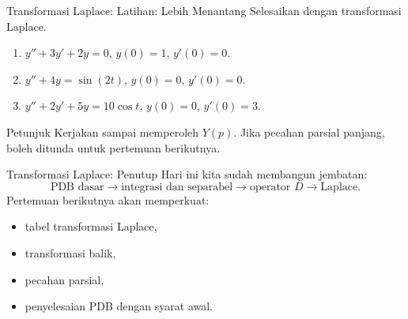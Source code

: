 \documentclass[aspectratio=169,11pt]{beamer}
\begin{document}
\begin{frame}{Transformasi Laplace: Latihan: Lebih Menantang}
Selesaikan dengan transformasi Laplace.
\begin{enumerate}
  \item $y''+3y'+2y=0$, $y(0)=1$, $y'(0)=0$.
  \item $y''+4y=\sin(2t)$, $y(0)=0$, $y'(0)=0$.
  \item $y''+2y'+5y=10\cos t$, $y(0)=0$, $y'(0)=3$.
\end{enumerate}
\begin{alertblock}{Petunjuk}
Kerjakan sampai memperoleh $Y(p)$. Jika pecahan parsial panjang, boleh ditunda untuk pertemuan berikutnya.
\end{alertblock}
\end{frame}

\begin{frame}{Transformasi Laplace: Penutup}
Hari ini kita sudah membangun jembatan:
\[
\text{PDB dasar}\rightarrow \text{integrasi dan separabel}\rightarrow \text{operator }D\rightarrow \text{Laplace}.
\]
Pertemuan berikutnya akan memperkuat:
\begin{itemize}
  \item tabel transformasi Laplace,
  \item transformasi balik,
  \item pecahan parsial,
  \item penyelesaian PDB dengan syarat awal.
\end{itemize}
\end{frame}
\end{document}
